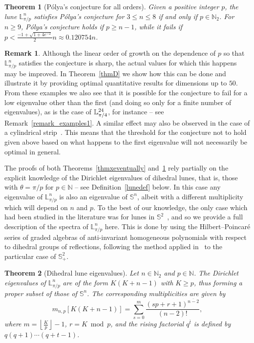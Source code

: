 \documentclass[11pt,a4paper,times]{amsart}
\theoremstyle{plain}
\newtheorem{thmx}{Theorem}%
\theoremstyle{definition}
\newtheorem{remark}{Remark}[section]
\numberwithin{equation}{section}
\newcommand{\ds}{\displaystyle}
\newcommand{\N}{\mathbb{N}}
\newcommand{\Se}{\mathbb{S}}
\newcommand{\fr}[2]{\frac{\ds #1}{\ds #2}}
\newcommand{\lune}[2]{\mathbb{L}^{#1}_{#2}}
\newcommand{\luned}[2]{\raisebox{0.5pt}{${}$}\mathbb{L}^{#1}_{\pi/#2}}
\begin{document}
\begin{thmx}[P\'{o}lya's conjecture for all orders]\label{thmxquantitative}
 Given a positive integer $p$, the lune $\lune{n}{\pi/p}$ satisfies P\'{o}lya's conjecture for $3\leq n \leq
 8$ if and only if $p\in\N_{2}$. For $n\geq 9$, P\'{o}lya's conjecture holds if $p\geq n-1$, {while
 it fails if $p<\fr{-1+\sqrt{1+4e^{-2}}}{2}n \approx 0.120754n$.}
\end{thmx}
\begin{remark}
  Although the linear order of growth on the dependence of $p$ so that $\lune{n}{\pi/p}$ satisfies the
  conjecture is sharp, the actual values for which this happens may be improved. In
  Theorem~\ref{thmD} we show how this can be done and illustrate it by providing optimal quantitative results for dimensions up to $50$.
  From these examples we also see that it is possible for the conjecture to fail for a low eigenvalue other than the
  first (and doing so only for a finite number of eigenvalues), as is the case of $\luned{24}{4}$, for instance -- see Remark~\ref{remark_examples1}.
  A similar effect may also be observed in the case of a cylindrical strip~\cite{frwa}. This means that the threshold for the
  conjecture not to hold given above based on what happens to the first eigenvalue will not necessarily be optimal in general.
\end{remark}

The proofs of both Theorems~\ref{thmxeventually} and~\ref{thmxquantitative} rely partially on the explicit
knowledge of the Dirichlet eigenvalues of dihedral lunes, that is, those with $\theta=\pi/p$ for $p\in \N$
-- see Definition~\ref{lunedef} below.
In this case any eigenvalue of $\lune{n}{\pi/p}$ is also an eigenvalue of $\Se^{n}$, albeit with a different multiplicity
which will depend on $n$ and $p$. To the best of our
knowledge, the only case which had been studied in the literature was for lunes in $\Se^{2}$~\cite{gr}, and so we
provide a full description of the spectra of $\lune{n}{\pi/p}$ here. This is done by using the Hilbert--Poincar\'{e}
series of graded algebras of anti-invariant homogeneous polynomials with respect to dihedral
groups of reflections, following the method applied in~\cite{bb} to the particular case of $\Se^2_+$.

\begin{thmx}[Dihedral lune eigenvalues]\label{thmxmultiplicity} Let $n\in \N_2$ and $p\in \N$. The Dirichlet eigenvalues of $\lune{n}
{\pi/p}$ are of the form $K(K+n-1)$ with $K\geq p$, thus forming a proper subset of those of $\Se^n$. The corresponding multiplicities
are given by
\[m_{n,p}[K(K+n-1)]=\sum_{s=0}^m\frac{(sp+r+1)^{\overline{n-2}}}{(n-2)!},\]
{where $m = \left\lfloor\fr{K}{p}\right\rfloor-1$, $r=K\bmod p$, and the rising factorial $q^{\overline{t}}$ is defined by
$q(q+1)\cdots(q+t-1)$.}
\end{thmx}
\end{document}

